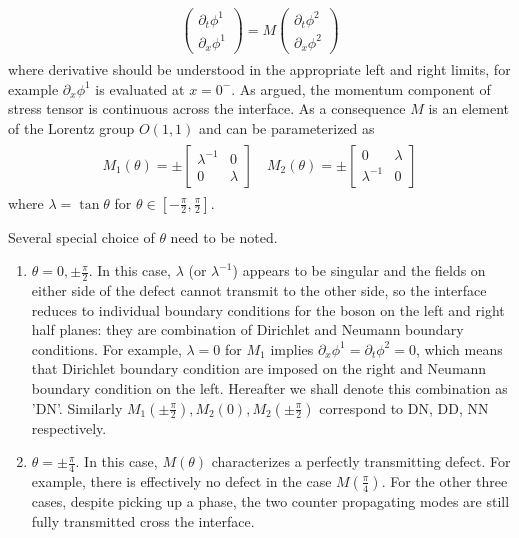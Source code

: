 \begin{eqnarray}\begin{aligned}
\label{eq:def_M}
\begin{pmatrix}
\partial_t\phi^1\\
\partial_x\phi^1
\end{pmatrix}
=M\begin{pmatrix}
\partial_t\phi^2\\
\partial_x\phi^2
\end{pmatrix}
\end{aligned}\end{eqnarray}
where derivative should be understood in the appropriate left and right limits, for example $\partial_x \phi^1$ is evaluated at $ x = 0^-$. As argued, the momentum component of stress tensor is continuous across the interface. As a consequence $M$ is an element of the Lorentz group $O(1,1)$ and can be parameterized as
\begin{eqnarray}\begin{aligned}
M_1(\theta)=\pm
\begin{bmatrix}
\lambda^{-1} & 0 \\
0 & \lambda
\end{bmatrix}\quad
M_2(\theta)=\pm
\begin{bmatrix}
0 & \lambda  \\
\lambda^{-1} & 0 
\end{bmatrix}
\end{aligned}\end{eqnarray}
where $\lambda=\tan\theta$ for $\theta\in\left[-\frac{\pi}{2},\frac{\pi}{2}\right]$. 

Several special choice of $\theta$ need to be noted. 
\begin{enumerate}
\item $\theta=0,\pm \frac{\pi}{2}$. In this case, $\lambda$ (or $\lambda^{-1}$) appears to be singular and the fields on either side of the defect cannot transmit to the other side, so the interface reduces to individual boundary conditions for the boson on the left and right half planes: they are combination of Dirichlet and Neumann boundary conditions. For example, $\lambda = 0$ for $M_1$ implies $\partial_x\phi^1 = \partial_t\phi^2 =0$, which means that Dirichlet boundary condition are imposed on the right and Neumann boundary condition on the left. Hereafter we shall denote this combination as 'DN'. Similarly $M_1(\pm\frac{\pi}{2}),M_2(0),M_2(\pm \frac{\pi}{2})$ correspond to DN, DD, NN respectively. 
\item $\theta = \pm \frac{\pi}{4}$. In this case, $M(\theta)$ characterizes a perfectly transmitting defect. For example, there is effectively no defect in the case $M( \frac{\pi}{4})$. For the other three cases, despite picking up a phase, the two counter propagating modes are still fully transmitted cross the interface. 
\end{enumerate}

